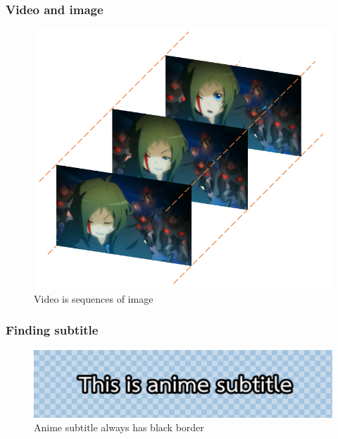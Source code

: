 \documentclass[xcolor=dvipsnames, xetex,serif]{beamer}
\begin{document}
    \begin{frame}
    \frametitle{Video and image}
        \begin{figure}[H]
            \centering
            \includegraphics[width=0.6\linewidth]{images/anime-frame.png}
            \caption{Video is sequences of image}
        \end{figure}
    \end{frame}
    \begin{frame}
        \frametitle{Finding subtitle}
        \begin{figure}[H]
            \centering
            \includegraphics[width=0.8\linewidth]{images/subtitle-remove/thisisanimesubtitle.png}
            \caption{Anime subtitle always has black border}
        \end{figure}
    \end{frame}
\end{document}
